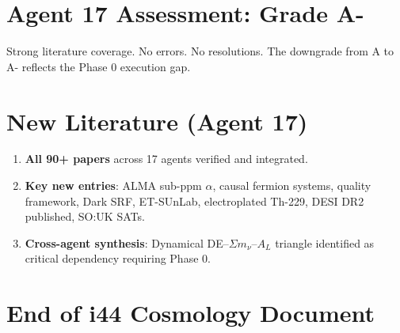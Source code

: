 \documentclass[11pt,a4paper]{article}
\begin{document}
\section{Agent 17 Assessment: Grade A-}

Strong literature coverage. No errors. No resolutions. The downgrade from A to A- reflects the Phase 0 execution gap.

\section{New Literature (Agent 17)}

\begin{enumerate}
\item \textbf{All 90+ papers} across 17 agents verified and integrated.
\item \textbf{Key new entries}: ALMA sub-ppm $\alpha$, causal fermion systems, quality framework, Dark SRF, ET-SUnLab, electroplated Th-229, DESI DR2 published, SO:UK SATs.
\item \textbf{Cross-agent synthesis}: Dynamical DE--$\Sigma m_\nu$--$A_L$ triangle identified as critical dependency requiring Phase 0.
\end{enumerate}


\section*{End of i44 Cosmology Document}
\end{document}
